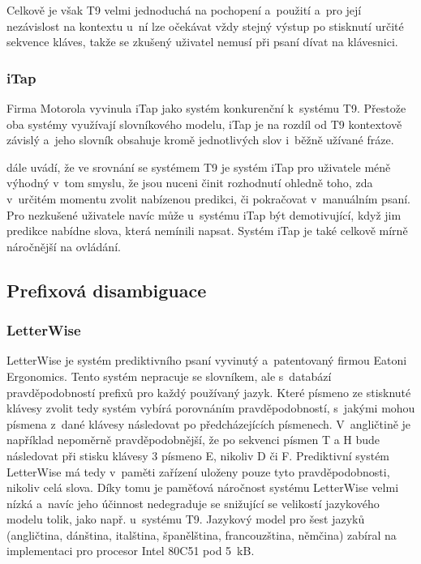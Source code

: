\documentclass[a4paper,11pt,openany]{book} %
\newcommand\exmp{\textsf}
\begin{document}
Celkově je však T9 velmi jednoduchá na pochopení a~použití a~pro její nezávislost na kontextu u~ní lze očekávat vždy stejný výstup po stisknutí určité sekvence kláves, takže se zkušený uživatel nemusí při psaní dívat na klávesnici. \parencite{davidmackay}

\subsubsection{iTap}

Firma Motorola vyvinula iTap jako systém konkurenční k~systému T9. Přestože oba systémy využívají slovníkového modelu, iTap je na rozdíl od T9 kontextově závislý a~jeho slovník obsahuje kromě jednotlivých slov i~běžně užívané fráze. 

\textcite{davidmackay} dále uvádí, že ve srovnání se systémem T9 je systém iTap pro uživatele méně výhodný v~tom smyslu, že jsou nuceni činit rozhodnutí ohledně toho, zda v~určitém momentu zvolit nabízenou predikci, či pokračovat v~manuálním psaní. Pro nezkušené uživatele navíc může u~systému iTap být demotivující, když jim predikce nabídne slova, která nemínili napsat. Systém iTap je také celkově mírně náročnější na ovládání.

\subsection{Prefixová disambiguace}

\subsubsection{LetterWise}

LetterWise je systém prediktivního psaní vyvinutý a~patentovaný firmou Eatoni Ergonomics. Tento systém nepracuje se slovníkem, ale s~databází pravděpodobností prefixů pro každý používaný jazyk. Které písmeno ze stisknuté klávesy zvolit tedy systém vybírá porovnáním pravděpodobností, s~jakými mohou písmena z~dané klávesy následovat po předcházejících písmenech. V~angličtině je například nepoměrně pravděpodobnější, že po sekvenci písmen \exmp{T} a \exmp{H} bude následovat při stisku klávesy \exmp{3} písmeno \exmp{E}, nikoliv \exmp{D} či \exmp{F}. Prediktivní systém LetterWise má tedy v~paměti zařízení uloženy pouze tyto pravděpodobnosti, nikoliv celá slova. \parencite{MacKenzie2001} Díky tomu je paměťová náročnost systému LetterWise velmi nízká a~navíc jeho účinnost nedegraduje se snižující se velikostí jazykového modelu tolik, jako např. u~systému T9. Jazykový model pro šest jazyků (angličtina, dánština, italština, španělština, francouzština, němčina) zabíral na implementaci pro procesor Intel 80C51 pod 5~kB. \parencite{eatoniletterwisereq} %
\end{document}
